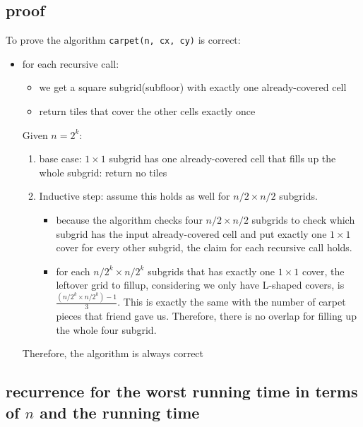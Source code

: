 \documentclass[11pt]{article}
\providecommand{\tightlist}{\setlength{\itemsep}{0pt}\setlength{\parskip}{0pt}}
\begin{document}
\hypertarget{proof}{%
\subsection{proof}\label{proof}}

To prove the algorithm \texttt{carpet(n,\ cx,\ cy)} is correct:

\begin{itemize}
\tightlist
\item
  for each recursive call:

  \begin{itemize}
  \tightlist
  \item
    we get a square subgrid(subfloor) with exactly one already-covered
    cell
  \item
    return tiles that cover the other cells exactly once
  \end{itemize}

  Given \(n=2^k\):

  \begin{enumerate}
  \def\labelenumi{\arabic{enumi}.}
  \tightlist
  \item
    base case: \(1 \times 1\) subgrid has one already-covered cell that
    fills up the whole subgrid: return no tiles
  \item
    Inductive step: assume this holds as well for \(n/2 \times n/2\)
    subgrids.

    \begin{itemize}
    \tightlist
    \item
      because the algorithm checks four \(n/2 \times n/2\) subgrids to
      check which subgrid has the input already-covered cell and put
      exactly one \(1 \times 1\) cover for every other subgrid, the
      claim for each recursive call holds.
    \item
      for each \(n/{2^k} \times n/{2^k}\) subgrids that has exactly one
      \(1 \times 1\) cover, the leftover grid to fillup, considering we
      only have L-shaped covers, is
      \(\frac{(n/{2^k} \times n/{2^k})-1}{3}\). This is exactly the same
      with the number of carpet pieces that friend gave us. Therefore,
      there is no overlap for filling up the whole four subgrid.
    \end{itemize}
  \end{enumerate}

  Therefore, the algorithm is always correct
\end{itemize}

\hypertarget{recurrence-for-the-worst-running-time-in-terms-of-n-and-the-running-time}{%
\subsection{\texorpdfstring{recurrence for the worst running time in
terms of \(n\) and the running
time}{recurrence for the worst running time in terms of n and the running time}}\label{recurrence-for-the-worst-running-time-in-terms-of-n-and-the-running-time}}
\end{document}
